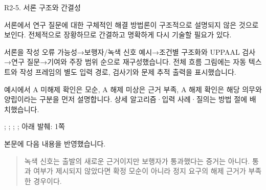 \begin{reviewitem}{R2-5. 서론 구조와 간결성}

\begin{reviewercomment}

서론에서 연구 질문에 대한 구체적인 해결 방법론이 구조적으로 설명되지 않은 것으로 보인다. 전체적으로 장황하므로 간결하고 명확하게 다시 기술할 필요가 있다.

\end{reviewercomment}

\begin{authorresponse}

서론을 작성 오류 가능성→보행자/녹색 신호 예시→조건별 구조화와 UPPAAL 검사→연구 질문→기여와 주장 범위 순으로 재구성했습니다. 전체 흐름 그림에는 자동 텍스트와 작성 프레임의 별도 입력 경로, 검사기와 문제 추적 출력을 표시했습니다.

예시에서 A 미해제 확인은 모순, A 해제 미상은 근거 부족, A 해제 확인은 해당 의무와 양립이라는 구분을 먼저 설명합니다. 상세 알고리즘·입력 사례·질의는 방법 절에 배치했습니다.

\end{authorresponse}

\begin{manuscriptrevision}{; ; ; ; 아래 발췌: 1쪽}

본문에 다음 내용을 반영했습니다.

\begin{quote}

녹색 신호는 출발의 새로운 근거이지만 보행자가 통과했다는 증거는 아니다. 통과 여부가 제시되지 않았다면 확정 모순이 아니라 정지 요구의 해제 근거가 부족한 경우이다.

\end{quote}

\end{manuscriptrevision}

\end{reviewitem}

\clearpage

